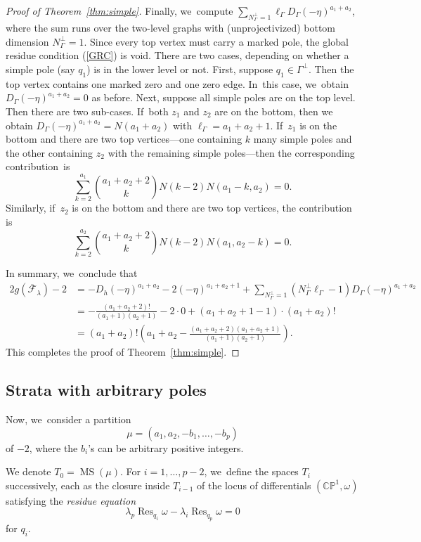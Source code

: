 \documentclass[JEP,XML,SOM,Unicode,NoFloatCountersInSection,published]{cedram}
\DeclareMathOperator\MS{MS}
\DeclareMathOperator\Res{Res}
\theoremstyle{definition}
\begin{document}
\begin{proof}[Proof of Theorem~\ref{thm:simple}]
Finally, we~compute $\sum_{N_\Gamma^{\bot} = 1} \ell_\Gamma D_\Gamma (-\eta)^{a_1+a_2}$, where the sum runs over the two-level graphs with (unprojectivized) bottom dimension $N_\Gamma^{\bot} = 1$. Since every top vertex must carry a marked pole, the global residue condition (\ref{GRC}) is void. There are two cases, depending on whether a simple pole (say $q_1$) is in the lower level or not. First, suppose $q_1\in \Gamma^\bot$. Then the top vertex contains one marked zero and one zero edge. In~this case, we~obtain $D_\Gamma (-\eta)^{a_1+a_2} = 0$ as before. Next, suppose all simple poles are on the top level. Then there are two sub-cases. If~both $z_1$ and $z_2$ are on the bottom, then we obtain
$D_\Gamma (-\eta)^{a_1+a_2} = N(a_1+a_2)$ with $\ell_\Gamma = a_1+a_2+1$. If~$z_1$ is on the bottom and there are two top vertices---one containing $k$ many simple poles and the other containing $z_2$ with the remaining simple poles---then the corresponding contribution~is
\[
\sum_{k=2}^{a_1} \binom{a_1+a_2+2}{k} N(k-2) N(a_1-k, a_2) = 0.
\]
Similarly, if~$z_2$ is on the bottom and there are two top vertices, the contribution is
\[
\sum_{k=2}^{a_2} \binom{a_1+a_2+2}{k} N(k-2) N(a_1, a_2-k) = 0.
\]

In summary, we~conclude that
\begin{align*}
2g (\overline{\mathcal F}_\lambda) -2 & = - D_h (-\eta)^{a_1+a_2} - 2 (-\eta)^{a_1+a_2+1} +
\sum_{N_\Gamma^{\bot} = 1} (N_\Gamma^{\bot}\ell_\Gamma - 1) D_\Gamma (-\eta)^{a_1+a_2} \\
& = - \frac{(a_1+a_2+2)!}{(a_1+1)(a_2+1)} - 2\cdot 0 + (a_1+a_2+1-1) \cdot (a_1+a_2)! \\
& = (a_1+a_2)! \left( a_1+a_2 - \frac{(a_1+a_2+2)(a_1+a_2+1)}{(a_1+1)(a_2+1)} \right).
\end{align*}
This completes the proof of Theorem~\ref{thm:simple}.
\end{proof}

\subsection{Strata with arbitrary poles}

Now, we~consider a partition
\[
\mu = (a_1, a_2, -b_1, \ldots, -b_p)
\]
of $-2$, where the $b_i$'s can be arbitrary positive integers.

We denote $T_0= \MS(\mu)$. For $i=1,\ldots,p-2$, we~define the spaces $T_i$ successively, each as the closure inside $T_{i-1}$ of the locus of differentials $(\mathbb{C}\mathbb{P}^1,\omega)$ satisfying the {\em residue equation}
\[
\lambda_{p} \Res_{q_i}\omega-\lambda_{i} \Res_{q_p}\omega=0
\]
for $q_i$.
\end{document}
